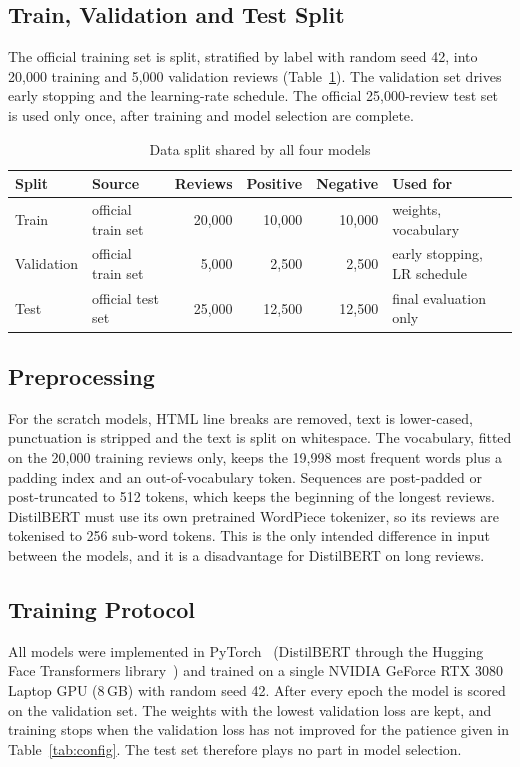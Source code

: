 \documentclass[conference,onecolumn,a4paper,10pt]{IEEEtran}
\begin{document}
\subsection{Train, Validation and Test Split}
The official training set is split, stratified by label with random seed 42, into 20,000 training and 5,000 validation reviews (Table~\ref{tab:split}). The validation set drives early stopping and the learning-rate schedule. The official 25,000-review test set is used only once, after training and model selection are complete.

\begin{table}[!t]
\caption{Data split shared by all four models}\label{tab:split}
\centering\footnotesize\renewcommand{\arraystretch}{1.15}
\begin{tabular}{@{}l l r r r l@{}}
\toprule
\textbf{Split} & \textbf{Source} & \textbf{Reviews} & \textbf{Positive} & \textbf{Negative} & \textbf{Used for} \\
\midrule
Train & official train set & 20,000 & 10,000 & 10,000 & weights, vocabulary \\
Validation & official train set & 5,000 & 2,500 & 2,500 & early stopping, LR schedule \\
Test & official test set & 25,000 & 12,500 & 12,500 & final evaluation only \\
\bottomrule
\end{tabular}
\end{table}

\subsection{Preprocessing}
For the scratch models, HTML line breaks are removed, text is lower-cased, punctuation is stripped and the text is split on whitespace. The vocabulary, fitted on the 20,000 training reviews only, keeps the 19,998 most frequent words plus a padding index and an out-of-vocabulary token. Sequences are post-padded or post-truncated to 512 tokens, which keeps the beginning of the longest reviews. DistilBERT must use its own pretrained WordPiece tokenizer, so its reviews are tokenised to 256 sub-word tokens. This is the only intended difference in input between the models, and it is a disadvantage for DistilBERT on long reviews.

\subsection{Training Protocol}
All models were implemented in PyTorch~\cite{paszke2019} (DistilBERT through the Hugging Face Transformers library~\cite{wolf2020}) and trained on a single NVIDIA GeForce RTX 3080 Laptop GPU (8\,GB) with random seed 42. After every epoch the model is scored on the validation set. The weights with the lowest validation loss are kept, and training stops when the validation loss has not improved for the patience given in Table~\ref{tab:config}. The test set therefore plays no part in model selection.
\end{document}
